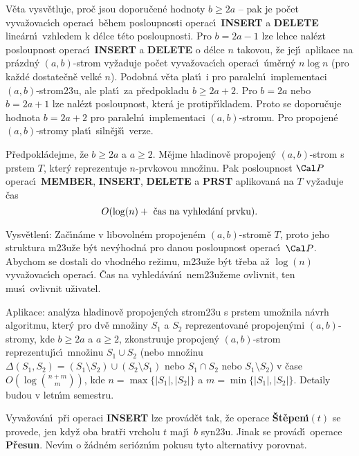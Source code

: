 \documentclass[a4paper,12pt]{article}
\begin{document}
\flushpar V\v eta vysv\v etluje, pro\v c jsou doporu\v cen\'e hodnoty $
b\ge 2a$ -- 
pak je po\v cet vyva\v zovac\'\i ch ope\-rac\'\i\ b\v ehem posloupnosti 
operac\'\i\ {\bf INSERT} a {\bf DELETE} line\'arn\'\i\ vzhledem k d\'elce 
t\'eto posloupnosti. Pro $b=2a-1$ lze lehce nal\'ezt 
posloupnost operac\'\i\ {\bf INSERT} a {\bf DELETE} o d\'elce $n$ takovou, 
\v ze jej\'\i\ aplikace na pr\'azdn\'y $(a,b)$-strom vy\v zaduje po\v cet 
vyva\v zovac\'\i ch operac\'\i\ \'u\-m\v ern\'y $n\log n$ (pro ka\v zd\'e 
dostate\v cn\v e velk\'e $n$). Podobn\'a v\v eta plat\'\i\ i pro paraleln\'\i\ 
implementaci $(a,b)$-strom\accent23u, ale plat\'\i\ za 
p\v redpokladu $b\ge 2a+2$. Pro $b=2a$ nebo $b=2a+1$ lze 
nal\'ezt posloupnost, kter\'a je protip\v r\'\i kladem. Proto se 
doporu\v cuje hodnota $b=2a+2$ pro paraleln\'\i\ implementaci 
$(a,b)$-stromu. Pro propojen\'e $(a,b)$-stromy plat\'\i\ siln\v ej\v s\'\i\ 
verze.

P\v redpokl\'adejme, \v ze $b\ge 2a$ a $a\ge 2$. M\v ejme 
hladinov\v e propojen\'y $(a,b)$-strom s prstem $T$, kter\'y reprezentuje 
$n$-prvkovou mno\v zinu. Pak posloupnost $\Cal P$ operac\'\i\ {\bf MEMBER},
{\bf INSERT}, {\bf DELETE} a {\bf PRST} aplikovan\'a na $T$ vy\v zaduje \v cas 
$$O(\log(n)+\text{\rm\ \v cas na vyhled\'an\'\i\ prvk\accent23u})
.$$
\endproclaim


\flushpar Vysv\v etlen\'\i : Za\v c\'\i n\'ame v libovoln\'em 
propojen\'em $(a,b)$-stro\-m\v e $T$, proto jeho struktura 
m\accent23u\v ze b\'yt nev\'yhodn\'a pro danou pos\-loupnost operac\'\i\ $
\Cal P$. 
Abychom se dostali do vhodn\'eho re\v zimu, m\accent23u\v ze 
b\'yt t\v reba a\v z $\log(n)$ vyva\v zovac\'\i ch operac\'\i . \v Cas na 
vy\-hled\'av\'a\-n\'\i\ nem\accent23u\v zeme ovlivnit, ten mus\'\i\ 
ovlivnit u\v zivatel.
\medskip

\flushpar Aplikace: anal\'yza hladinov\v e propojen\'ych strom\accent23u s prstem 
u\-mo\v z\-nila n\'avrh algoritmu, kter\'y pro dv\v e mno\v ziny $
S_1$ a $S_2$ 
repre\-zentovan\'e propojen\'ymi $(a,b)$-stromy, kde $b\ge 2a$ a 
$a\ge 2$, 
zkonstruuje propojen\'y $(a,b)$-strom reprezentuj\'\i c\'\i\ mno\v zinu 
$S_1\cup S_2$ (nebo mno\v zinu $\Delta (S_1,S_2)=(S_1\setminus S_
2)\cup (S_2\setminus S_1)$ nebo 
$S_1\cap S_2$ nebo $S_1\setminus S_2$) v \v case $O(\log\binom {n
+m}m)$, kde 
$n=\max\{|S_1|,|S_2|\}$ a $m=\min\{|S_1|,|S_2|\}$. Detaily budou v letn\'\i m 
semestru.
\medskip

\flushpar Vyva\v zov\'an\'\i\ p\v ri operaci {\bf INSERT} lze prov\'ad\v et 
tak, \v ze operace {\bf \v St\v epen\'\i$(t)$} se provede, jen kdy\v z oba 
brat\v ri vrcholu $t$ maj\'\i\ $b$ syn\accent23u. Jinak se prov\'ad\'\i\ 
operace {\bf P\v resun}. Nev\'\i m o \v z\'adn\'em seri\'ozn\'\i m pokusu tyto 
alternativy porovnat.   
\medskip
\end{document}
